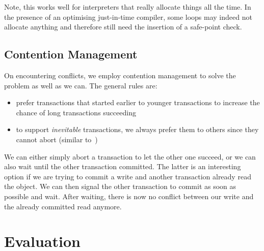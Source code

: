 \documentclass{sigplanconf}
\begin{document}
Note, this works well for interpreters that really allocate things
all the time. In the presence of an optimising just-in-time compiler,
some loops may indeed not allocate anything and therefore still need
the insertion of a safe-point check.



\subsection{Contention Management\label{subsub:contentionmanagement}}

On encountering conflicts, we employ contention management to solve
the problem as well as we can. The general rules are:

\begin{itemize}
\item prefer transactions that started earlier to younger transactions
  to increase the chance of long transactions succeeding
\item to support \emph{inevitable} transactions, we always prefer them
  to others since they cannot abort (similar to~\cite{blundell06})
\end{itemize}

We can either simply abort a transaction to let the other one succeed,
or we can also wait until the other transaction committed. The latter
is an interesting option if we are trying to commit a write and
another transaction already read the object. We can then signal the
other transaction to commit as soon as possible and wait. After
waiting, there is now no conflict between our write and the already
committed read anymore.



\section{Evaluation}
\end{document}
